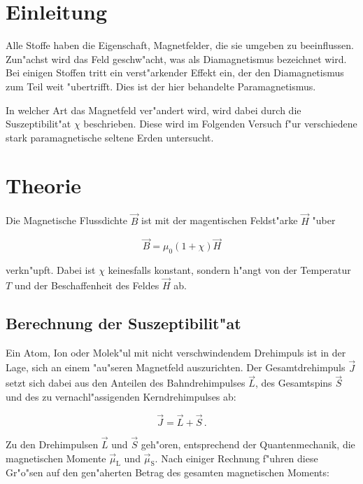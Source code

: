 \section{Einleitung} %
	\label{sec:einleitung}

	Alle Stoffe haben die Eigenschaft, Magnetfelder, die sie umgeben zu beeinflussen.
	Zun"achst wird das Feld geschw"acht, was als Diamagnetismus bezeichnet wird.
	Bei einigen Stoffen tritt ein verst"arkender Effekt ein, der den Diamagnetismus zum Teil weit "ubertrifft.
	Dies ist der hier behandelte Paramagnetismus.

	In welcher Art das Magnetfeld ver"andert wird, wird dabei durch die Suszeptibilit"at $\chi$ beschrieben. Diese wird im Folgenden Versuch f"ur verschiedene stark paramagnetische seltene Erden untersucht.

\section{Theorie} %
	\label{sec:theorie}

	Die Magnetische Flussdichte $\vec{B}$ ist mit der magentischen Feldst"arke $\vec{H}$ "uber

	\begin{equation*}
		\vec{B} = \mu_0 \left(1 + \chi\right) \vec{H}
	\end{equation*}

	verkn"upft.
	Dabei ist $\chi$ keinesfalls konstant, sondern h"angt von der Temperatur $T$ und der Beschaffenheit des Feldes $\vec{H}$ ab.

	\subsection{Berechnung der Suszeptibilit"at}
		\label{subsec:berechnung}
		Ein Atom, Ion oder Molek"ul mit nicht verschwindendem Drehimpuls ist in der Lage, sich an einem "au"seren Magnetfeld auszurichten.
		Der Gesamtdrehimpuls $\vec{J}$ setzt sich dabei aus den Anteilen des Bahndrehimpulses $\vec{L}$, des Gesamtspins $\vec{S}$ und des zu vernachl"assigenden Kerndrehimpulses ab:

		\begin{equation*}
			\vec{J} = \vec{L} + \vec{S}\,.
		\end{equation*}

		Zu den Drehimpulsen $\vec{L}$ und $\vec{S}$ geh"oren, entsprechend der Quantenmechanik, die magnetischen Momente $\vec{\mu}_\mathrm{L}$ und $\vec{\mu}_\mathrm{S}$.
		Nach einiger Rechnung f"uhren diese Gr"o"sen auf den gen"aherten Betrag des gesamten magnetischen Moments:

